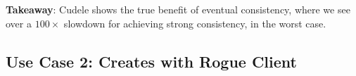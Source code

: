 \noindent\textbf{Takeaway}: Cudele shows the true benefit of eventual
consistency, where we see over a \(100\times\) slowdown for achieving strong
consistency, in the worst case.

%
%
%
%
%
%
%
%
%
%
%

\subsection{Use Case 2: Creates with Rogue Client}

